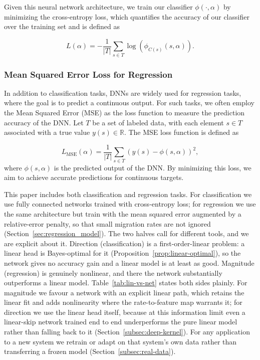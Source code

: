 \documentclass[11pt]{article}
\theoremstyle{plain}
\theoremstyle{definition}
\theoremstyle{remark}
\begin{document}
Given this neural network architecture, we train our classifier $\phi(\cdot, \alpha)$ by minimizing the cross-entropy loss, which quantifies the accuracy of our classifier over the training set and is defined as

\begin{equation}
\label{CE}
L(\alpha) = -\frac{1}{|T|} \sum_{s \in T} \log\left(\phi_{C(s)}(s, \alpha)\right).
\end{equation}


\subsubsection{Mean Squared Error Loss for Regression}
\label{mse_loss_regression}

In addition to classification tasks, DNNs are widely used for regression tasks, where the goal is to predict a continuous output. For such tasks, we often employ the Mean Squared Error (MSE) as the loss function to measure the prediction accuracy of the DNN. Let $T$ be a set of labeled data, with each element $s \in T$ associated with a true value $y(s) \in \mathbb{R}$. The MSE loss function is defined as

\begin{equation}
\label{MSE}
L_{\text{MSE}}(\alpha) = \frac{1}{|T|} \sum_{s \in T} \left( y(s) - \phi(s, \alpha) \right)^2,
\end{equation}
where $\phi(s, \alpha)$ is the predicted output of the DNN. By minimizing this loss, we aim to achieve accurate predictions for continuous targets.

This paper includes both classification and regression tasks. For classification we use fully connected networks trained with cross-entropy loss; for regression we use the same architecture but train with the mean squared error augmented by a relative-error penalty, so that small migration rates are not ignored (Section~\ref{sec:regression_model}). The two halves call for different tools, and we are explicit about it. Direction (classification) is a first-order-linear problem: a linear head is Bayes-optimal for it (Proposition~\ref{prop:linear-optimal}), so the network gives no accuracy gain and a linear model is at least as good. Magnitude (regression) is genuinely nonlinear, and there the network substantially outperforms a linear model. Table~\ref{tab:lin-vs-net} states both sides plainly. For magnitude we favour a network with an explicit linear path, which retains the linear fit and adds nonlinearity where the rate-to-feature map warrants it; for direction we use the linear head itself, because at this information limit even a linear-skip network trained end to end underperforms the pure linear model rather than falling back to it (Section~\ref{subsec:deep-kernel}). For any application to a new system we retrain or adapt on that system's own data rather than transferring a frozen model (Section~\ref{subsec:real-data}).
\end{document}
